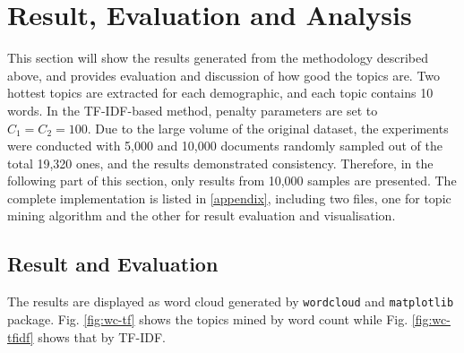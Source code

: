 \documentclass[conference]{IEEEtran}
\begin{document}
\hypertarget{sec:result}{%
\section{Result, Evaluation and Analysis}\label{sec:result}}

This section will show the results generated from the methodology
described above, and provides evaluation and discussion of how good the
topics are. Two hottest topics are extracted for each demographic, and
each topic contains 10 words. In the TF-IDF-based method, penalty
parameters are set to \(C_1=C_2=100\). Due to the large volume of the
original dataset, the experiments were conducted with 5,000 and 10,000
documents randomly sampled out of the total 19,320 ones, and the results
demonstrated consistency. Therefore, in the following part of this
section, only results from 10,000 samples are presented. The complete
implementation is listed in \cref{appendix}, including two files, one
for topic mining algorithm and the other for result evaluation and
visualisation.

\hypertarget{result-and-evaluation}{%
\subsection{Result and Evaluation}\label{result-and-evaluation}}

The results are displayed as word cloud generated by \texttt{wordcloud}
and \texttt{matplotlib} package. Fig. \ref{fig:wc-tf} shows the topics
mined by word count while Fig. \ref{fig:wc-tfidf} shows that by TF-IDF.
\end{document}
